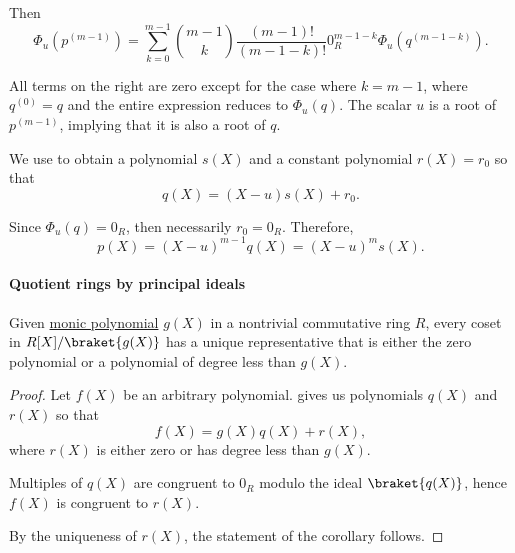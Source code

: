 \begin{defproof}
  Then
  \begin{equation*}
    \Phi_u(p^{(m-1)}) = \sum_{k=0}^{m-1} \binom {m-1} k \frac {(m - 1)!} {(m - 1 - k)!} 0_R^{m - 1 - k} \Phi_u(q^{(m - 1 - k)}).
  \end{equation*}

  All terms on the right are zero except for the case where \( k = m - 1 \), where \( q^{(0)} = q \) and the entire expression reduces to \( \Phi_u(q) \). The scalar \( u \) is a root of \( p^{(m-1)} \), implying that it is also a root of \( q \).

  We use  to obtain a polynomial \( s(X) \) and a constant polynomial \( r(X) = r_0 \) so that
  \begin{equation*}
    q(X) = (X - u) s(X) + r_0.
  \end{equation*}

  Since \( \Phi_u(q) = 0_R \), then necessarily \( r_0 = 0_R \). Therefore,
  \begin{equation*}
    p(X) = (X - u)^{m-1} q(X) = (X - u)^m s(X).
  \end{equation*}
\end{defproof}

\paragraph{Quotient rings by principal ideals}

\begin{proposition}\label{thm:representatives_in_univariate_polynomial_quotient_set}
  Given \hyperref[def:monic_polynomial]{monic polynomial} \( g(X) \) in a nontrivial commutative ring \( R \), every coset in \( R[X] / \braket{ g(X) } \) has a unique representative that is either the zero polynomial or a polynomial of degree less than \( g(X) \).
\end{proposition}
\begin{proof}
  Let \( f(X) \) be an arbitrary polynomial.  gives us polynomials \( q(X) \) and \( r(X) \) so that
  \begin{equation*}
    f(X) = g(X) q(X) + r(X),
  \end{equation*}
  where \( r(X) \) is either zero or has degree less than \( g(X) \).

  Multiples of \( q(X) \) are congruent to \( 0_R \) modulo the ideal \( \braket{ q(X) } \), hence \( f(X) \) is congruent to \( r(X) \).

  By the uniqueness of \( r(X) \), the statement of the corollary follows.
\end{proof}

